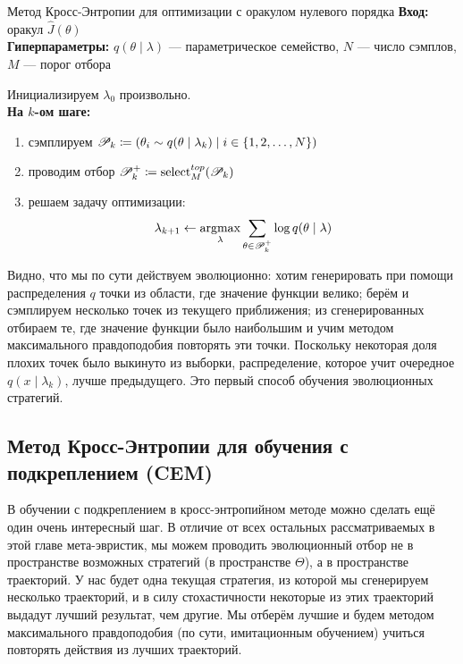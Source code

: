 \begin{algorithm}{Метод Кросс-Энтропии для оптимизации с оракулом нулевого порядка}
\textbf{Вход:} оракул $\hat{J}(\theta)$ \\
\textbf{Гиперпараметры:} $q(\theta \mid \lambda)$ --- параметрическое семейство, $N$ --- число сэмплов, $M$ --- порог отбора

\vspace{0.3cm}
Инициализируем $\lambda_0$ произвольно. \\
\textbf{На $k$-ом шаге:}
\begin{enumerate}
    \item сэмплируем $\mathscr{P}_k \coloneqq \left( \theta_i \sim q(\theta \mid \lambda_k) \mid i \in \{1, 2, \dots, N\} \right)$
    \item проводим отбор $\mathscr{P}^{+}_k \coloneqq \mathrm{select}^{\mathop{top}}_M(\mathscr{P}_k)$
    \item решаем задачу оптимизации:
    $$\lambda_{k+1} \leftarrow \mathop{\mathrm{argmax}}_{\lambda} \sum_{\theta \in \mathscr{P}^{+}_k} \log q(\theta \mid \lambda)$$
\end{enumerate}
\end{algorithm}

Видно, что мы по сути действуем эволюционно: хотим генерировать при помощи распределения $q$ точки из области, где значение функции велико; берём и сэмплируем несколько точек из текущего приближения; из сгенерированных отбираем те, где значение функции было наибольшим и учим методом максимального правдоподобия повторять эти точки. Поскольку некоторая доля плохих точек было выкинуто из выборки, распределение, которое учит очередное $q(x \mid \lambda_k)$, лучше предыдущего. Это первый способ обучения эволюционных стратегий.

\subsection{Метод Кросс-Энтропии для обучения с подкреплением (CEM)}

В обучении с подкреплением в кросс-энтропийном методе можно сделать ещё один очень интересный шаг. В отличие от всех остальных рассматриваемых в этой главе мета-эвристик, мы можем проводить эволюционный отбор не в пространстве возможных стратегий (в пространстве $\Theta$), а в пространстве траекторий. У нас будет одна текущая стратегия, из которой мы сгенерируем несколько траекторий, и в силу стохастичности некоторые из этих траекторий выдадут лучший результат, чем другие. Мы отберём лучшие и будем методом максимального правдоподобия (по сути, имитационным обучением) учиться повторять действия из лучших траекторий.  

